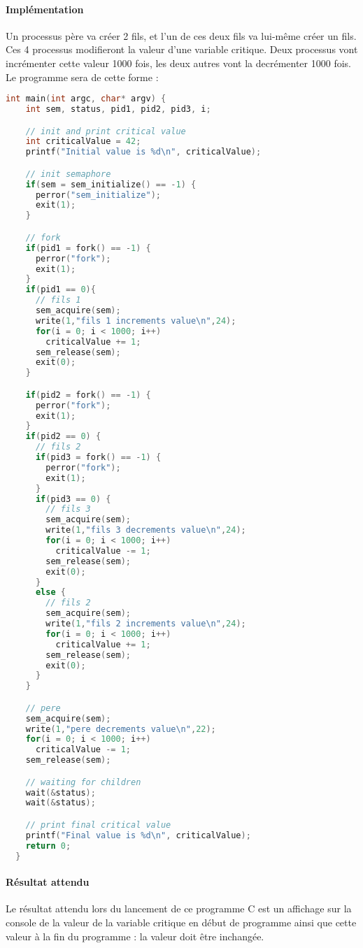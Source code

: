 \documentclass[12pt]{article}
\begin{document}
  \paragraph{Implémentation\\}
  Un processus père va créer 2 fils, et l'un de ces deux fils va lui-même créer un fils. Ces 4 processus modifieront la valeur d'une variable critique. Deux processus vont incrémenter cette valeur 1000 fois, les deux autres vont la decrémenter 1000 fois.
  Le programme sera de cette forme :
  \begin{lstlisting}[language=C]
  int main(int argc, char* argv) {
    int sem, status, pid1, pid2, pid3, i;

    // init and print critical value
    int criticalValue = 42;
    printf("Initial value is %d\n", criticalValue);

    // init semaphore
    if(sem = sem_initialize() == -1) {
      perror("sem_initialize");
      exit(1);
    }

    // fork
    if(pid1 = fork() == -1) {
      perror("fork");
      exit(1);
    }
    if(pid1 == 0){
      // fils 1
      sem_acquire(sem);
      write(1,"fils 1 increments value\n",24);
      for(i = 0; i < 1000; i++)
        criticalValue += 1;
      sem_release(sem);
      exit(0);
    }

    if(pid2 = fork() == -1) {
      perror("fork");
      exit(1);
    }
    if(pid2 == 0) {
      // fils 2
      if(pid3 = fork() == -1) {
        perror("fork");
        exit(1);
      }
      if(pid3 == 0) {
        // fils 3
        sem_acquire(sem);
        write(1,"fils 3 decrements value\n",24);
        for(i = 0; i < 1000; i++)
          criticalValue -= 1;
        sem_release(sem);
        exit(0);
      }
      else {
        // fils 2
        sem_acquire(sem);
        write(1,"fils 2 increments value\n",24);
        for(i = 0; i < 1000; i++)
          criticalValue += 1;
        sem_release(sem);
        exit(0);
      }
    }

    // pere
    sem_acquire(sem);
    write(1,"pere decrements value\n",22);
    for(i = 0; i < 1000; i++)
      criticalValue -= 1;
    sem_release(sem);

    // waiting for children
    wait(&status);
    wait(&status);

    // print final critical value
    printf("Final value is %d\n", criticalValue);
    return 0;
  }
  \end{lstlisting}
  \paragraph{Résultat attendu\\}
  Le résultat attendu lors du lancement de ce programme C est un affichage sur la console de la valeur de la variable critique en début de programme ainsi que cette valeur à la fin du programme : la valeur doit être inchangée.
\end{document}
